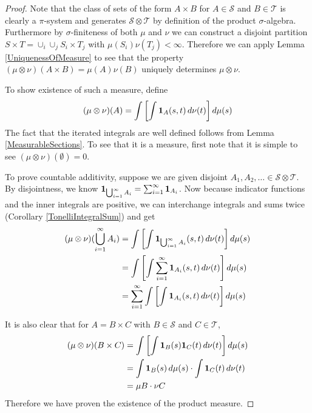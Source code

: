 \begin{proof}Note that the class of sets of the form $A \times B$ for
  $A \in \mathcal{S}$ and $B \in \mathcal{T}$ is clearly a
  $\pi$-system and generates $\mathcal{S} \otimes \mathcal{T}$ by
  definition of the product $\sigma$-algebra.  Furthermore by
  $\sigma$-finiteness of both $\mu$ and $\nu$ we can construct a
  disjoint partition $S \times T = \cup_i \cup_j S_i \times T_j$ with
  $\mu(S_i)\nu(T_j) < \infty$.  Therefore we can apply Lemma
  \ref{UniquenessOfMeasure} to see that the property $(\mu \otimes
  \nu)(A \times B) = \mu(A) \nu(B)$ uniquely determines $\mu \otimes
  \nu$.

To show existence of such a measure, define 
\begin{align*}
(\mu \otimes \nu)(A) = \int \left [\int \textbf{1}_{A}(s,t) \, d
  \nu(t) \right ] d \mu(s)
\end{align*}
The fact that the iterated integrals are well defined follows from
Lemma \ref{MeasurableSections}.  
To see that it is a measure, first
note that it is simple to see $(\mu \otimes \nu)(\emptyset) = 0$.

To prove countable additivity, suppose we are given disjoint $A_1,
A_2, \dots \in \mathcal{S}
\otimes \mathcal{T}$.  By disjointness, we know
$\textbf{1}_{\bigcup_{i=1}^\infty A_i} = \sum_{i=1}^\infty \textbf{1}_{A_i}$.
Now because indicator functions and the inner integrals are positive, we can interchange
integrals and sums twice (Corollary \ref{TonelliIntegralSum}) and get
\begin{align*}
(\mu \otimes \nu)(\bigcup_{i=1}^\infty A_i) &= \int \left [ \int
\textbf{1}_{\bigcup_{i=1}^\infty A_i}(s,t) \, d \nu(t) \right ] d \mu(s)\\
&= \int \left [ \int \sum_{i=1}^\infty \textbf{1}_{A_i}(s,t) \, d
  \nu(t) \right ]  d \mu(s)\\
&= \sum_{i=1}^\infty \int \left [ \int \textbf{1}_{A_i}(s,t) \, d
  \nu(t) \right ] d \mu(s)\\
\end{align*}

It is also clear that for $A = B \times C$ with $B \in \mathcal{S}$
and $C \in \mathcal{T}$, 
\begin{align*}
(\mu \otimes \nu)(B \times C) &= \int \left [ \int \textbf{1}_{B}(s)
\textbf{1}_{C}(t) \, d\nu(t) \right ] d \mu(s)\\
&= \int \textbf{1}_{B}(s) \, d \mu(s) \cdot \int 
\textbf{1}_{C}(t) \, d\nu(t) \\
&= \mu B \cdot \nu C
\end{align*}
Therefore we have proven the existence of the product measure.


\end{proof}

